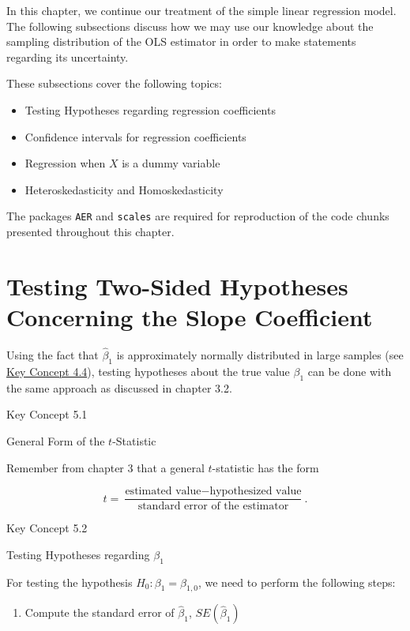 \documentclass[]{book}
\providecommand{\tightlist}{%
  \setlength{\itemsep}{0pt}\setlength{\parskip}{0pt}}
\theoremstyle{definition}
\theoremstyle{definition}
\theoremstyle{definition}
\theoremstyle{remark}
\begin{document}
In this chapter, we continue our treatment of the simple linear
regression model. The following subsections discuss how we may use our
knowledge about the sampling distribution of the OLS estimator in order
to make statements regarding its uncertainty.

These subsections cover the following topics:

\begin{itemize}
\item
  Testing Hypotheses regarding regression coefficients
\item
  Confidence intervals for regression coefficients
\item
  Regression when \(X\) is a dummy variable
\item
  Heteroskedasticity and Homoskedasticity
\end{itemize}

The packages \texttt{AER} and \texttt{scales} are required for
reproduction of the code chunks presented throughout this chapter.

\section{Testing Two-Sided Hypotheses Concerning the Slope
Coefficient}\label{testing-two-sided-hypotheses-concerning-the-slope-coefficient}

Using the fact that \(\hat{\beta}_1\) is approximately normally
distributed in large samples (see \protect\hyperlink{tsdotoe}{Key
Concept 4.4}), testing hypotheses about the true value \(\beta_1\) can
be done with the same approach as discussed in chapter 3.2.

Key Concept 5.1

General Form of the \(t\)-Statistic

Remember from chapter 3 that a general \(t\)-statistic has the form

\[
  t = \frac{\text{estimated value} - \text{hypothesized value}}{\text{standard error of the estimator}}.
\]

Key Concept 5.2

Testing Hypotheses regarding \(\beta_1\)

For testing the hypothesis \(H_0: \beta_1 = \beta_{1,0}\), we need to
perform the following steps:

\begin{enumerate}
\def\labelenumi{\arabic{enumi}.}
\tightlist
\item
  Compute the standard error of \(\hat{\beta}_1\), \(SE(\hat{\beta}_1)\)
\end{enumerate}
\end{document}
